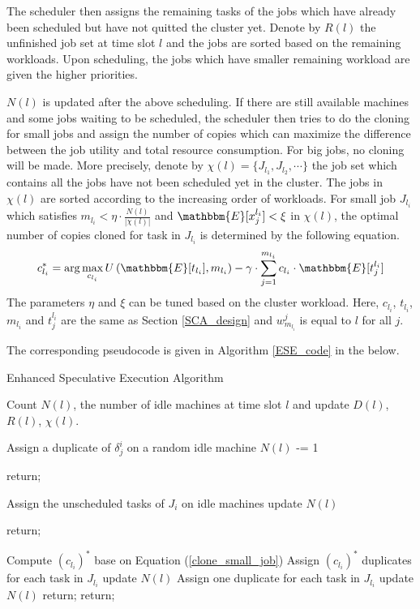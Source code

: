 \documentclass[10pt,conference]{IEEEtran}
\begin{document}
The scheduler then assigns the remaining tasks of the jobs which have already been scheduled  but have not quitted the cluster yet. Denote by $R(l)$ the unfinished job set at time slot $l$ and the jobs are sorted based on the remaining workloads. Upon scheduling, the jobs which have smaller remaining workload are given the higher priorities.


$N(l)$ is updated after the above scheduling. If there are still available machines and some jobs waiting to be scheduled, the scheduler then tries to do the cloning for small jobs and assign the number of copies which can maximize the difference between the job utility and total resource consumption. For big jobs, no cloning will be made. More precisely, denote by $\chi(l) = \{J_{l_1}, J_{l_2}, \cdots\}$ the job set which contains all the jobs have not been scheduled yet in the cluster. The jobs in $\chi(l)$ are sorted according to the increasing order of workloads. For small job $J_{l_i}$  which satisfies $m_{l_i} <\eta \cdot  \frac{N(l)}{|\chi(l)|}$ and $\mathbbm{E}[x^{l_i}_j] < \xi $ in $\chi(l)$, the optimal number of copies cloned for task in $J_{l_i}$ is determined by the following equation.
\begin{equation}
c^*_{l_i} =  \arg \max_{c_{l_i}}U\left( \mathbbm{E}[t_{l_i}],m_{l_i}\right) - \gamma \cdot  \sum_{j=1}^{m_{l_i}}c_{l_i}\cdot \mathbbm{E}[t^{l_i}_j]
\label{clone_small_job}
\end{equation}
The parameters $\eta$ and $\xi$ can be tuned based on the cluster workload. Here, $c_{l_i}$, $t_{l_i}$, $m_{l_i}$ and $t^{l_i}_j$ are the same as Section \ref{SCA_design} and $w^{j}_{m_{l_i}}$ is equal to $l$ for all $j$.

The corresponding pseudocode is given in Algorithm \ref{ESE_code} in the below.

\IncMargin{1em}
\begin{algorithm}
\label{ESE_code}
\caption{Enhanced Speculative Execution Algorithm}
\Indm
{}
\Indp
Count $N(l)$, the number of idle machines at time slot $l$ and update $D(l)$, $R(l)$, $\chi(l)$.

{
Assign a duplicate of  $\delta^i_j$ on a random idle machine\;
$N(l)$ -= 1\;

{
return;
}
}
{
Assign the unscheduled tasks of $J_i$ on idle machines\;
update $N(l)$\;

{
return;
}
}
{
{
Compute $(c_{l_i})^*$ base on Equation (\ref{clone_small_job})\;
Assign $(c_{l_i})^*$ duplicates for each task in $J_{l_i}$\;
update $N(l)$\;
}
{
Assign one duplicate for each task in $J_{l_i}$\;
update $N(l)$\;
}
{
return;
}
}
return;
\end{algorithm}
\vspace{-0.3em}
\DecMargin{1em}
\end{document}
